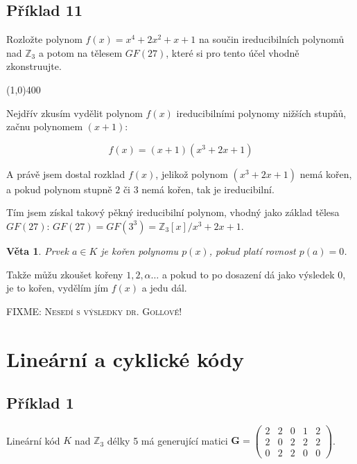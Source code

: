 \documentclass{article}
\newtheorem{veta}{Věta}[section]
\begin{document}
\subsection{Příklad 11}
Rozložte polynom $f(x) = x^4 + 2x^2 + x + 1$ na součin ireducibilních polynomů nad $\mathbb{Z}_3$ a potom na tělesem $GF(27)$, které si pro tento účel vhodně zkonstruujte.

\line(1,0){400}

Nejdřív zkusím vydělit polynom $f(x)$ ireducibilními polynomy nižších stupňů, začnu polynomem $(x+1)$:

\[ f(x)=(x+1)(x^3 + 2x + 1) \]

A právě jsem dostal rozklad $f(x)$, jelikož polynom $(x^3 + 2x + 1)$ nemá kořen, a pokud polynom stupně $2$ či $3$ nemá kořen, tak je ireducibilní.

Tím jsem získal takový pěkný ireducibilní polynom, vhodný jako základ tělesa $GF(27)$: $GF(27) = GF(3^3) = \mathbb{Z}_3[x]/x^3 + 2x + 1$. 

\begin{veta}
Prvek $a \in K$ je kořen polynomu $p(x)$, pokud platí rovnost $p(a) = 0$.
\end{veta}

Takže můžu zkoušet kořeny $1,2,\alpha \ldots$ a pokud to po dosazení dá jako výsledek $0$, je to kořen, vydělím jím $f(x)$ a jedu dál.
\begin{center}
\textsc{FIXME: Nesedí s výsledky dr. Gollové!}	
\end{center}

\clearpage

\section{Lineární a cyklické kódy}

\subsection{\label{priklad3-1}Příklad 1}
Lineární kód $K$ nad $\mathbb{Z}_3$ délky 5 má generující matici $\mathbf{G} = 
\begin{pmatrix}
  2 & 2 & 0 & 1 & 2 \\
  2 & 0 & 2 & 2 & 2 \\
  0 & 2 & 2 & 0 & 0
\end{pmatrix}$.
\end{document}
